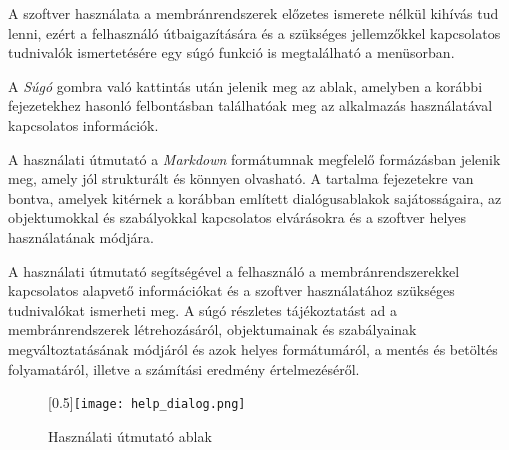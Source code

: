 A szoftver használata a membránrendszerek előzetes ismerete nélkül kihívás tud lenni, ezért a felhasználó útbaigazítására és a szükséges jellemzőkkel kapcsolatos tudnivalók ismertetésére egy súgó funkció is megtalálható a menüsorban.

A \textit{Súgó} gombra való kattintás után jelenik meg az ablak, amelyben a korábbi fejezetekhez hasonló felbontásban találhatóak meg az alkalmazás használatával kapcsolatos információk.

A használati útmutató a \textit{Markdown} formátumnak megfelelő formázásban jelenik meg, amely jól strukturált és könnyen olvasható. A tartalma fejezetekre van bontva, amelyek kitérnek a korábban említett dialógusablakok sajátosságaira, az objektumokkal és szabályokkal kapcsolatos elvárásokra és a szoftver helyes használatának módjára.



A használati útmutató segítségével a felhasználó a membránrendszerekkel kapcsolatos alapvető információkat és a szoftver használatához szükséges tudnivalókat ismerheti meg. A súgó részletes tájékoztatást ad a membránrendszerek létrehozásáról, objektumainak és szabályainak megváltoztatásának módjáról és azok helyes formátumáról, a mentés és betöltés folyamatáról, illetve a számítási eredmény értelmezéséről.

\begin{figure}[H]
	\centering
	\scalebox{0.5}[0.5]{\texttt{[image: help\_dialog.png]}}
	\caption{Használati útmutató ablak}
	\label{fig:help_dialog}
\end{figure}